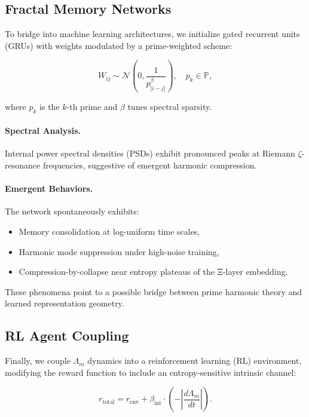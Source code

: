 \documentclass{article}
\theoremstyle{plain}
\theoremstyle{claimstyle}
\begin{document}
\subsection{Fractal Memory Networks}

To bridge into machine learning architectures, we initialize gated recurrent units (GRUs) with weights modulated by a prime-weighted scheme:

\begin{equation}
W_{ij} \sim \mathcal{N}\left(0, \frac{1}{p_{|i-j|}^\beta} \right), \quad p_k \in \mathbb{P},
\end{equation}

where $p_k$ is the $k$-th prime and $\beta$ tunes spectral sparsity.

\paragraph{Spectral Analysis.} Internal power spectral densities (PSDs) exhibit pronounced peaks at Riemann $\zeta$-resonance frequencies, suggestive of emergent harmonic compression.

\paragraph{Emergent Behaviors.} The network spontaneously exhibits:
\begin{itemize}
    \item Memory consolidation at log-uniform time scales,
    \item Harmonic mode suppression under high-noise training,
    \item Compression-by-collapse near entropy plateaus of the Ξ-layer embedding.
\end{itemize}

These phenomena point to a possible bridge between prime harmonic theory and learned representation geometry.

\subsection{RL Agent Coupling}

Finally, we couple $\Lambda_m$ dynamics into a reinforcement learning (RL) environment, modifying the reward function to include an entropy-sensitive intrinsic channel:

\begin{equation}
r_{\text{total}} = r_{\text{env}} + \beta_{\text{int}} \cdot \left( -\left|\frac{d\Lambda_m}{dt} \right| \right).
\end{equation}
\end{document}
